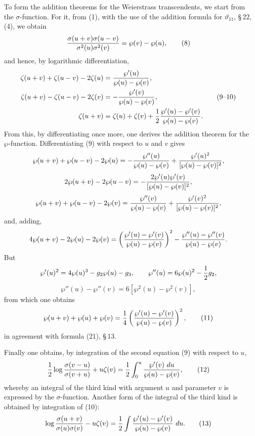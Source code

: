 \documentclass[11pt]{article}
\providecommand{\dd}{\,d}
\begin{document}
To form the addition theorems for the Weierstrass transcendents, we start from the $\sigma$-function. For it, from (1), with the use of the addition formula for $\vartheta_{11}$, \S\,22, (4), we obtain
\begin{equation}
{\sigma(u+v)\sigma(u-v)\over\sigma^2(u)\sigma^2(v)}=\wp(v)-\wp(u),
\tag{8}
\end{equation}
and hence, by logarithmic differentiation,
\begin{equation}
\begin{aligned}
\zeta(u+v)+\zeta(u-v)-2\zeta(u)&={\wp'(u)\over\wp(u)-\wp(v)},\\
\zeta(u+v)-\zeta(u-v)-2\zeta(v)&=-{\wp'(v)\over\wp(u)-\wp(v)},\\
\zeta(u+v)&=\zeta(u)+\zeta(v)+{1\over2}{\wp'(u)-\wp'(v)\over\wp(u)-\wp(v)}.
\end{aligned}
\tag{9--10}
\end{equation}
From this, by differentiating once more, one derives the addition theorem for the $\wp$-function. Differentiating (9) with respect to $u$ and $v$ gives
\[
\wp(u+v)+\wp(u-v)-2\wp(u)=-{\wp''(u)\over\wp(u)-\wp(v)}+{\wp'(u)^2\over[\wp(u)-\wp(v)]^2},
\]
\[
2\wp(u+v)-2\wp(u-v)=-{2\wp'(u)\wp'(v)\over[\wp(u)-\wp(v)]^2},
\]
\[
\wp(u+v)+\wp(u-v)-2\wp(v)={\wp''(v)\over\wp(u)-\wp(v)}+{\wp'(v)^2\over[\wp(u)-\wp(v)]^2},
\]
and, adding,
\[
4\wp(u+v)-2\wp(u)-2\wp(v)
=\left({\wp'(u)-\wp'(v)\over\wp(u)-\wp(v)}\right)^2
-{\wp''(u)-\wp''(v)\over\wp(u)-\wp(v)}.
\]
But
\[
\wp'(u)^2=4\wp(u)^3-g_2\wp(u)-g_3,
\qquad
\wp''(u)=6\wp(u)^2-{1\over2}g_2,
\]
\[
\wp''(u)-\wp''(v)=6[\wp^2(u)-\wp^2(v)],
\]
from which one obtains
\begin{equation}
\wp(u+v)+\wp(u)+\wp(v)=
{1\over4}\left({\wp'(u)-\wp'(v)\over\wp(u)-\wp(v)}\right)^2,
\tag{11}
\end{equation}
in agreement with formula (21), \S\,13.

Finally one obtains, by integration of the second equation (9) with respect to $u$,
\begin{equation}
{1\over2}\log{\sigma(v-u)\over\sigma(v+u)}+u\zeta(v)
={1\over2}\int_0^u{\wp'(v)\,\dd u\over\wp(u)-\wp(v)},
\tag{12}
\end{equation}
whereby an integral of the third kind with argument $u$ and parameter $v$ is expressed by the $\sigma$-function. Another form of the integral of the third kind is obtained by integration of (10):
\begin{equation}
\log{\sigma(u+v)\over\sigma(u)\sigma(v)}-u\zeta(v)
={1\over2}\int {\wp'(u)-\wp'(v)\over\wp(u)-\wp(v)}\,\dd u.
\tag{13}
\end{equation}
\end{document}
